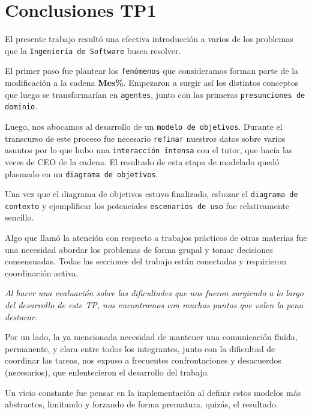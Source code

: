 
\section{Conclusiones TP1}

El presente trabajo resultó una efectiva introducción a varios de los problemas
que la \texttt{Ingeniería de Software} busca resolver.

El primer paso fue plantear los \texttt{fenómenos} que consideramos forman parte
de la modificación a la cadena \textbf{Mes\%}. Empezaron a surgir así los
distintos conceptos que luego se transformarían en \texttt{agentes}, junto con
las primeras \texttt{presunciones de dominio}.

Luego, nos abocamos al desarrollo de un \texttt{modelo de objetivos}. Durante el
transcurso de este proceso fue necesario \texttt{refinar} nuestros datos sobre
varios asuntos por lo que hubo una \texttt{interacción intensa} con el tutor,
que hacía las veces de CEO de la cadena. El resultado de esta etapa de modelado
quedó plasmado en un \texttt{diagrama de objetivos}.

Una vez que el diagrama de objetivos estuvo finalizado, esbozar el
\texttt{diagrama de contexto} y ejemplificar los potenciales \texttt{escenarios
de uso} fue relativamente sencillo.

Algo que llamó la atención con respecto a trabajos prácticos de otras materias
fue una necesidad abordar los problemas de forma grupal y tomar decisiones
consensuadas. Todas las secciones del trabajo están conectadas y requirieron
coordinación activa.

\emph{Al hacer una evaluación sobre las dificultades que nos fueron surgiendo a
lo largo del desarrollo de este TP, nos encontramos con muchos puntos que valen
la pena destacar}.

Por un lado, la ya mencionada necesidad de mantener una comunicación fluída,
permanente, y clara entre todos los integrantes, junto con la dificultad de
coordinar las tareas, nos expuso a frecuentes confrontaciones y desacuerdos
(necesarios), que enlentecieron el desarrollo del trabajo.

Un vicio constante fue pensar en la implementación al definir estos modelos más
abstractos, limitando y forzando de forma prematura, quizás, el resultado.

